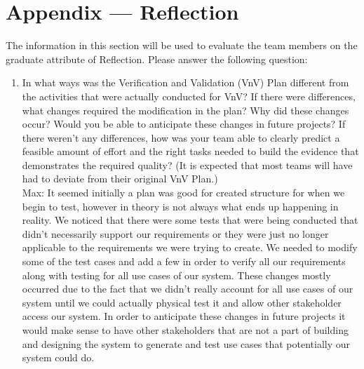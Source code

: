\documentclass[12pt, titlepage]{article}
\begin{document}



\newpage{}
\section*{Appendix --- Reflection}

The information in this section will be used to evaluate the team members on the
graduate attribute of Reflection.  Please answer the following question:

\begin{enumerate}
  \item In what ways was the Verification and Validation (VnV) Plan different
  from the activities that were actually conducted for VnV?  If there were
  differences, what changes required the modification in the plan?  Why did
  these changes occur?  Would you be able to anticipate these changes in future
  projects?  If there weren't any differences, how was your team able to clearly
  predict a feasible amount of effort and the right tasks needed to build the
  evidence that demonstrates the required quality?  (It is expected that most
  teams will have had to deviate from their original VnV Plan.) \\

  Max: It seemed initially a plan was good for created structure for when we begin to test, however in theory is not always what ends up happening in reality. We noticed that there were some tests that were being conducted that didn't necessarily support our requirements or they were just no longer applicable to the requirements we were trying to create. We needed to modify some of the test cases and add a few in order to verify all our requirements along with testing for all use cases of our system. These changes mostly occurred due to the fact that we didn't really account for all use cases of our system until we could actually physical test it and allow other stakeholder access our system. In order to anticipate these changes in future projects it would make sense to have other stakeholders that are not a part of building and designing the system to generate and test use cases that potentially our system could do.


\end{enumerate}
\end{document}
